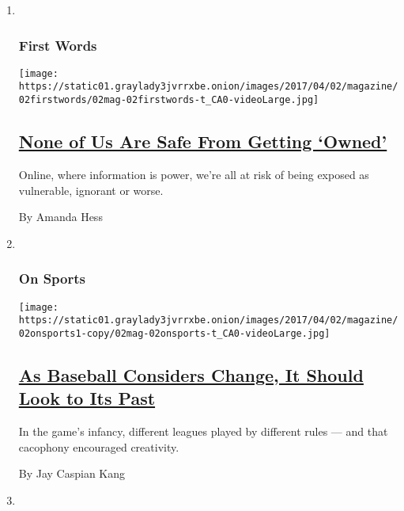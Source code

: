 \begin{enumerate}
\def\labelenumi{\arabic{enumi}.}
\item ~
  \hypertarget{first-words}{%
  \subsubsection{First Words}\label{first-words}}

  \texttt{[image: https://static01.graylady3jvrrxbe.onion/images/2017/04/02/magazine/02firstwords/02mag-02firstwords-t\_CA0-videoLarge.jpg]}

  \hypertarget{none-of-us-are-safe-from-getting-owned}{%
  \subsection{\texorpdfstring{\href{/2017/03/28/magazine/none-of-us-are-safe-from-getting-owned.html}{None
  of Us Are Safe From Getting
  `Owned'}}{None of Us Are Safe From Getting `Owned'}}\label{none-of-us-are-safe-from-getting-owned}}

  Online, where information is power, we're all at risk of being exposed
  as vulnerable, ignorant or worse.

  By Amanda Hess
\item ~
  \hypertarget{on-sports}{%
  \subsubsection{On Sports}\label{on-sports}}

  \texttt{[image: https://static01.graylady3jvrrxbe.onion/images/2017/04/02/magazine/02onsports1-copy/02mag-02onsports-t\_CA0-videoLarge.jpg]}

  \hypertarget{as-baseball-considers-change-it-should-look-to-its-past}{%
  \subsection{\texorpdfstring{\href{/2017/03/28/magazine/as-baseball-considers-change-it-should-look-to-its-past.html}{As
  Baseball Considers Change, It Should Look to Its
  Past}}{As Baseball Considers Change, It Should Look to Its Past}}\label{as-baseball-considers-change-it-should-look-to-its-past}}

  In the game's infancy, different leagues played by different rules ---
  and that cacophony encouraged creativity.

  By Jay Caspian Kang
\item ~
  \hypertarget{talk}{%
}
\end{enumerate}

